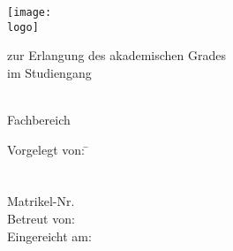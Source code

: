 \begin{titlepage}

\begin{minipage}{\textwidth}
		\noindent \hfill \texttt{[image: \\logo]}
\end{minipage}
\vspace{6em}

\begin{center}
    {\huge \art}
    
    {\Large zur Erlangung des akademischen Grades \akadGrad}\\
    {\Large im Studiengang \studiengang}
    
    \vspace{3em}
    
    \textbf{{\Large \titel}}
    
    \vspace{3em}
    
    \hochschule \\
    Fachbereich \fachbereich
    
    \vspace{4em}

	\begin{minipage}{\textwidth}
		\begin{tabbing}
		
		Vorgelegt von:  \hspace*{2em}\= \autor \\
		\> \strasseAutor \\
        \> \stadtAutor \\
        \> Matrikel-Nr. \matrikelnr \\
        Betreut von: \> \betreuer \\
        Eingereicht am: \> \datumAbgabe
		\end{tabbing}

	\end{minipage}
\end{center}
\end{titlepage}